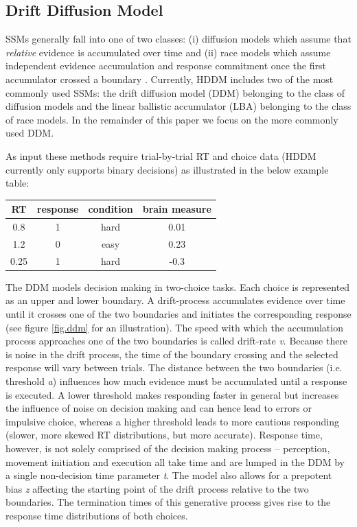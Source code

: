 \documentclass[letterpaper,10pt,english]{article}
\begin{document}
\subsection*{Drift Diffusion Model}
\label{methods:sequential-sampling-models}
SSMs generally fall into one of two classes: (i) diffusion models
which assume that \emph{relative} evidence is accumulated over time
and (ii) race models which assume independent evidence accumulation
and response commitment once the first accumulator crossed a boundary
\citep{LaBerge62,Vickers70}. Currently, HDDM includes two of the most
commonly used SSMs: the drift diffusion model (DDM)
\citep{RatcliffRouder98,RatcliffMcKoon08} belonging to the
class of diffusion models and the linear ballistic accumulator (LBA)
\citep{BrownHeathcote08} belonging to the class of race models. In the
remainder of this paper we focus on the more commonly used DDM.

As input these methods require trial-by-trial RT and choice data (HDDM
currently only supports binary decisions) as illustrated in the below
example table:

\begin{tabular}{c|c|c|c}
RT & response & condition & brain measure \\
\hline
0.8 & 1 & hard & 0.01 \\
1.2 & 0 & easy & 0.23 \\
0.25 & 1 & hard & -0.3
\end{tabular}

The DDM models decision making in two-choice tasks. Each choice is
represented as an upper and lower boundary. A drift-process
accumulates evidence over time until it crosses one of the two
boundaries and initiates the corresponding response
\citep{RatcliffRouder98,SmithRatcliff04} (see figure \ref{fig.ddm} for
an illustration). The speed with which the accumulation process
approaches one of the two boundaries is called drift-rate \emph{v}.
Because there is noise in the drift process, the time of the boundary
crossing and the selected response will vary between trials. The
distance between the two boundaries (i.e. threshold \emph{a})
influences how much evidence must be accumulated until a response is
executed. A lower threshold makes responding faster in general but
increases the influence of noise on decision making and can hence lead
to errors or impulsive choice, whereas a higher threshold leads to
more cautious responding (slower, more skewed RT distributions, but
more accurate). Response time, however, is not solely comprised of the
decision making process -- perception, movement initiation and
execution all take time and are lumped in the DDM by a single
non-decision time parameter \emph{t}. The model also allows for a
prepotent bias \emph{z} affecting the starting point of the drift
process relative to the two boundaries. The termination times of this
generative process gives rise to the response time distributions of
both choices.
\end{document}
